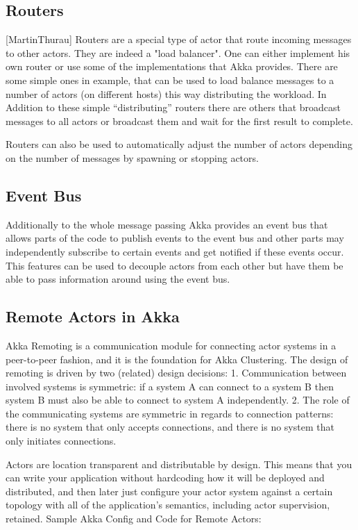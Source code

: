   \subsection{Routers} [MartinThurau]
  Routers are a special type of actor that route incoming messages to other actors. They are indeed a "load balancer". One can either implement his own router or use some of the implementations that Akka provides. There are some simple ones in example, that can be used to load balance messages to a number of actors (on different hosts) this way distributing the workload. In Addition to these simple “distributing” routers there are others that broadcast messages to all actors or broadcast them and wait for the first result to complete.

  Routers can also be used to automatically adjust the number of actors depending on the number of messages by spawning or stopping actors.

  \subsection{Event Bus}
  Additionally to the whole message passing Akka provides an event bus that allows parts of the code to publish events to the event bus and other parts may independently subscribe to certain events and get notified if these events occur.
  This features can be used to decouple actors from each other but have them be able to pass information around using the event bus.

  \subsection{Remote Actors in Akka}
  Akka Remoting is a communication module for connecting actor systems in a peer-to-peer fashion, and it is the foundation for Akka Clustering. The design of remoting is driven by two (related) design decisions:
  1. Communication between involved systems is symmetric: if a system A can connect to a system B then system B must also be able to connect to system A independently.
  2. The role of the communicating systems are symmetric in regards to connection patterns: there is no system that only accepts connections, and there is no system that only initiates connections.~\parencite{akkaJavaDoc}

Actors are location transparent and distributable by design. This means that you can write your application without hardcoding how it will be deployed and distributed, and then later just configure your actor system against a certain topology with all of the application’s semantics, including actor supervision, retained.
Sample Akka Config and Code for Remote Actors: ~\parencite{akkaHome}

